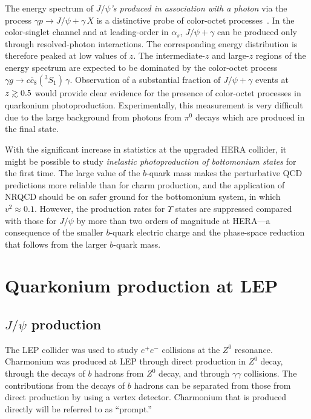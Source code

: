 The energy spectrum of {\em $J/\psi$'s produced in association with a
photon} via the process $\gamma p \to J/\psi + \gamma\,X$ is a
distinctive probe of color-octet
processes~\cite{Kim:1993at,Cacciari:1996dy,Mehen:1997vx,Cacciari:1997zu}.
In the color-singlet channel and at leading-order in $\alpha_s$, $J/\psi
+ \gamma$ can be produced only through resolved-photon interactions. The
corresponding energy distribution is therefore peaked at low values of
$z$. The intermediate-$z$ and large-$z$ regions of the energy spectrum
are  expected to be dominated by the color-octet process $\gamma g \to
c\bar c_8({}^3\!S_1)\,\gamma$. Observation of a substantial fraction of
$J/\psi + \gamma$ events at $z\;\rlap{\lower 3.5 pt \hbox{$\mathchar
\sim$}} \raise 1pt \hbox {$>$}\; 0.5$ would provide clear evidence for
the presence of color-octet processes in quarkonium photoproduction.
Experimentally, this measurement is very difficult due to the
large background from photons from $\pi^0$ decays which are produced
in the final state.

With the significant increase in statistics at the upgraded HERA
collider, it might be possible to study {\em inelastic photoproduction
of bottomonium states} for the first time. The large value of the
$b$-quark mass makes the perturbative QCD predictions more reliable than
for charm production, and the application of NRQCD should be on safer
ground for the bottomonium system, in which $v^2 \approx 0.1$. However,
the production rates for $\Upsilon$ states are suppressed compared with
those for $J/\psi$ by more than two orders of magnitude at HERA---a
consequence of the smaller $b$-quark electric charge and the phase-space
reduction that follows from the larger $b$-quark mass.


%

\section{Quarkonium production at LEP}
\label{prodsec:lep}

\subsection{$J/\psi$ production}

The LEP collider was used to study $e^+ e^-$ collisions at the $Z^0$
resonance. Charmonium was produced at LEP through direct production
in $Z^0$ decay, through the decays of $b$ hadrons from $Z^0$ decay,
and through $\gamma \gamma$ collisions.  
The contributions from the decays of $b$ hadrons can be separated from 
those from direct production by using a vertex detector.
Charmonium that is produced directly will be referred to as ``prompt.''

